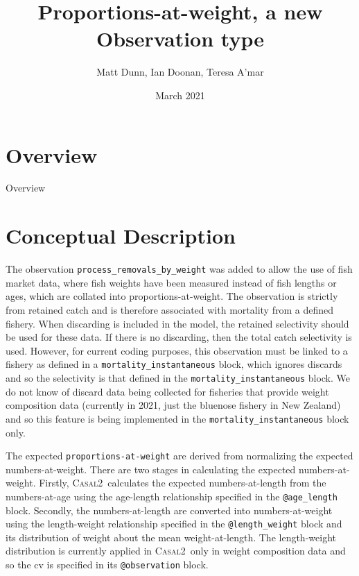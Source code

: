 \documentclass[a4paper,11pt,twoside,pdftex,draft]{article}
\title{Proportions-at-weight, a new Observation type}
\author{Matt Dunn, Ian Doonan, Teresa A'mar}
\date{March 2021}
\newcommand{\CNAME}{\textsc{Casal2}}
\begin{document}
\maketitle

\pagestyle{plain}
\setcounter{page}{1}


\newpage

\section{Overview}

Overview

\section{Conceptual Description}

The observation \texttt{process\_removals\_by\_weight} was added to allow the use of fish market data, where fish weights have been measured instead of fish lengths or ages, which are collated into proportions-at-weight. The observation is strictly from retained catch and is therefore associated with mortality from a defined fishery. When discarding is included in the model, the retained selectivity should be used for these data. If there is no discarding, then the total catch selectivity is used. However, for current coding purposes, this observation must be linked to a fishery as defined in a \texttt{mortality\_instantaneous} block, which ignores discards and so the selectivity is that defined in the \texttt{mortality\_instantaneous} block. We do not know of discard data being collected for fisheries that provide weight composition data (currently in 2021, just the bluenose fishery in New Zealand) and so this feature is being implemented in the \texttt{mortality\_instantaneous} block only.

The expected  \texttt{proportions-at-weight} are derived from normalizing the expected numbers-at-weight. There are two stages in calculating the expected numbers-at-weight. Firstly, \CNAME~calculates the expected numbers-at-length from the numbers-at-age using the age-length relationship specified in the \texttt{@age\_length} block. Secondly, the numbers-at-length are converted into numbers-at-weight using the length-weight relationship specified in the \texttt{@length\_weight} block and its distribution of weight about the mean weight-at-length. The length-weight distribution is currently applied in \CNAME~only in weight composition data and so the cv is specified in its \texttt{@observation} block.
\end{document}
